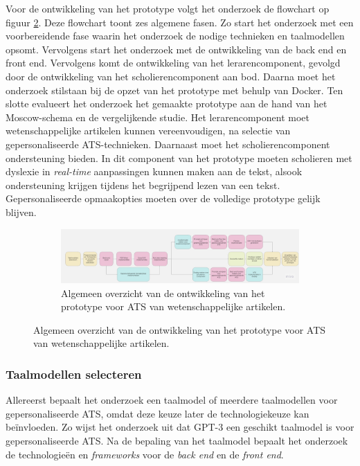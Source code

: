 Voor de ontwikkeling van het prototype volgt het onderzoek de flowchart op figuur \ref{img:general-overview-prototype}. Deze flowchart toont zes algemene fasen. Zo start het onderzoek met een voorbereidende fase waarin het onderzoek de nodige technieken en taalmodellen opsomt. Vervolgens start het onderzoek met de ontwikkeling van de back end en front end. Vervolgens komt de ontwikkeling van het lerarencomponent, gevolgd door de ontwikkeling van het scholierencomponent aan bod. Daarna moet het onderzoek stilstaan bij de opzet van het prototype met behulp van Docker. Ten slotte evalueert het onderzoek het gemaakte prototype aan de hand van het Moscow-schema en de vergelijkende studie. Het lerarencomponent moet wetenschappelijke artikelen kunnen vereenvoudigen, na selectie van gepersonaliseerde ATS-technieken. Daarnaast moet het scholierencomponent ondersteuning bieden. In dit component van het prototype moeten scholieren met dyslexie in \textit{real-time} aanpassingen kunnen maken aan de tekst, alsook ondersteuning krijgen tijdens het begrijpend lezen van een tekst. Gepersonaliseerde opmaakopties moeten over de volledige prototype gelijk blijven.


\begin{figure}
	\begin{figure}[H]
		\includegraphics[width=\linewidth]{img/flowchart-general-development.jpg}
		\caption{Algemeen overzicht van de ontwikkeling van het prototype voor ATS van wetenschappelijke artikelen.}
		\label{img:general-overview-prototype}
	\end{figure}
\end{figure}

\subsubsection{Taalmodellen selecteren}

Allereerst bepaalt het onderzoek een taalmodel of meerdere taalmodellen voor gepersonaliseerde ATS, omdat deze keuze later de technologiekeuze kan beïnvloeden. Zo wijst het onderzoek uit dat GPT-3 een geschikt taalmodel is voor gepersonaliseerde ATS. Na de bepaling van het taalmodel bepaalt het onderzoek de technologieën en \textit{frameworks} voor de \textit{back end} en de \textit{front end}. 


